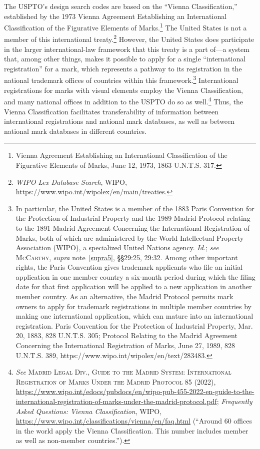 \documentclass[letterpaper, 11pt, oneside]{article}
\begin{document}
The USPTO's design search codes are based on the ``Vienna Classification,'' established by the 1973 Vienna Agreement Establishing an International Classification of the Figurative Elements of Marks.\footnote{Vienna Agreement Establishing an International Classification of the Figurative Elements of Marks, June 12, 1973, 1863 U.N.T.S. 317.} The United States is not a member of this international treaty.\footnote{\textit{WIPO Lex Database Search}, WIPO, https://www.wipo.int/wipolex/en/main/treaties.} However, the United States does participate in the larger international-law framework that this treaty is a part of—a system that, among other things, makes it possible to apply for a single ``international registration'' for a mark, which represents a pathway to its registration in the national trademark offices of countries within this framework.\footnote{In particular, the United States is a member of the 1883 Paris Convention for the Protection of Industrial Property and the 1989 Madrid Protocol relating to the 1891 Madrid Agreement Concerning the International Registration of Marks, both of which are administered by the World Intellectual Property Association (WIPO), a specialized United Nations agency. \textit{Id.}; \textit{see} \textsc{McCarthy}, \textit{supra} note~\ref{supra5}, \S\S 29:25, 29:32. Among other important rights, the Paris Convention gives trademark applicants who file an initial application in one member country a six-month period during which the filing date for that first application will be applied to a new application in another member country. As an alternative, the Madrid Protocol permits mark owners to apply for trademark registrations in multiple member countries by making one international application, which can mature into an international registration. Paris Convention for the Protection of Industrial Property, Mar. 20, 1883, 828 U.N.T.S. 305; Protocol Relating to the Madrid Agreement Concerning the International Registration of Marks, June 27, 1989, 828 U.N.T.S. 389, https://www.wipo.int/wipolex/en/text/283483.} International registrations for marks with visual elements employ the Vienna Classification, and many national offices in addition to the USPTO do so as well.\footnote{\textit{See} \textsc{Madrid Legal Div., Guide to the Madrid System: International Registration of Marks Under the Madrid Protocol} 85 (2022), \url{https://www.wipo.int/edocs/pubdocs/en/wipo-pub-455-2022-en-guide-to-the-international-registration-of-marks-under-the-madrid-protocol.pdf}; \textit{Frequently Asked Questions: Vienna Classification}, WIPO, \url{https://www.wipo.int/classifications/vienna/en/faq.html} (``Around 60 offices in the world apply the Vienna Classification. This number includes member as well as non-member countries.'').} Thus, the Vienna Classification facilitates transferability of information between international registrations and national mark databases, as well as between national mark databases in different countries.
\end{document}
